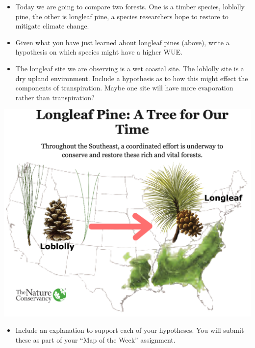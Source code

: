 \documentclass[oneside,a4paper,11pt,explicit]{book}
\begin{document}
\begin{tcolorbox}[colback=yellow!5!white,colframe=IceCreamLeaf,title=\textbf{Hypotheses}]
	\begin{multicols}{2}
	
	\begin{itemize}
		\item Today we are going to compare two forests. One is a timber species, loblolly pine,  the other is longleaf pine, a species researchers hope to restore to mitigate climate change.
		\item Given what you have just learned about longleaf pines (above), write a hypothesis on which species might have a higher WUE.
		\item The longleaf site we are observing is a wet coastal site. The loblolly site is a dry upland environment. Include a hypothesis as to how this might effect the components of transpiration. Maybe one site will have more evaporation rather than transpiration? 
	\end{itemize}
	
	\columnbreak

	\centerline{\includegraphics[width=\columnwidth]{SouthernPineIntro.png}}

	\begin{itemize}
		\item Include an explanation to support each of your hypotheses. You will submit these as part of your ``Map of the Week'' assignment.
	\end{itemize}

	\end{multicols}
\end{tcolorbox}
\end{document}
